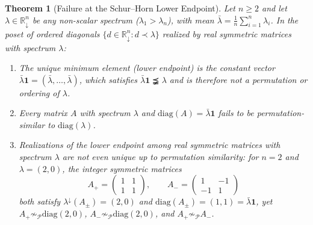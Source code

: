 \documentclass[11pt]{article}
\newtheorem{theorem}{Theorem}[section]
\theoremstyle{definition}
\theoremstyle{remark}
\newcommand{\R}{\mathbb{R}}
\newcommand{\diag}{\mathrm{diag}}
\newcommand{\Ones}{\mathbf{1}}
\begin{document}
\begin{theorem}[Failure at the Schur--Horn Lower Endpoint]
\label{thm:reading-i-lower}
Let $n \ge 2$ and let $\lambda \in \R_\downarrow^n$ be any non-scalar spectrum
($\lambda_1 > \lambda_n$), with mean $\bar{\lambda} = \frac{1}{n}\sum_{i=1}^n \lambda_i$.
In the poset of ordered diagonals $\{ d \in \R_\downarrow^n : d \prec \lambda \}$
realized by real symmetric matrices with spectrum $\lambda$:
\begin{enumerate}
  \item The unique minimum element (lower endpoint) is the constant vector
  $\bar{\lambda}\Ones = (\bar{\lambda},\dots,\bar{\lambda})$, which satisfies
  $\bar{\lambda}\Ones \precneqq \lambda$ and is therefore \emph{not} a permutation
  or ordering of $\lambda$.
  \item Every matrix $A$ with spectrum $\lambda$ and $\diag(A) = \bar{\lambda}\Ones$
  fails to be permutation-similar to $\diag(\lambda)$.
  \item Realizations of the lower endpoint among real symmetric matrices with
  spectrum $\lambda$ are not even unique up to permutation similarity: for $n = 2$
  and $\lambda = (2,0)$, the integer symmetric matrices
  \[
    A_+ = \begin{pmatrix} 1 & 1 \\ 1 & 1 \end{pmatrix},
    \qquad
    A_- = \begin{pmatrix} 1 & -1 \\ -1 & 1 \end{pmatrix}
  \]
  both satisfy $\lambda^\downarrow(A_\pm) = (2,0)$ and $\diag(A_\pm) = (1,1) =
  \bar{\lambda}\Ones$, yet $A_+ \not\sim_{\mathcal{P}} \diag(2,0)$,
  $A_- \not\sim_{\mathcal{P}} \diag(2,0)$, and $A_+ \not\sim_{\mathcal{P}} A_-$.
\end{enumerate}
\end{theorem}
\end{document}

